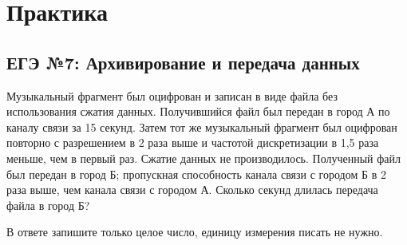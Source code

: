 \documentclass[11pt,a4paper]{article}
\begin{document}
\section{Практика}

\subsection{ЕГЭ №7: Архивирование и передача данных}
\begin{taskbox}{}
Музыкальный фрагмент был оцифрован и записан в виде файла без использования сжатия данных. Получившийся файл был передан в город А по каналу связи за 15 секунд. Затем тот же музыкальный фрагмент был оцифрован повторно с разрешением в 2 раза выше и частотой дискретизации в 1,5 раза меньше, чем в первый раз. Сжатие данных не производилось. Полученный файл был передан в город Б; пропускная способность канала связи с городом Б в 2 раза выше, чем канала связи с городом А. Сколько секунд длилась передача файла в город Б?

В ответе запишите только целое число, единицу измерения писать не нужно.
\end{taskbox}
\end{document}
